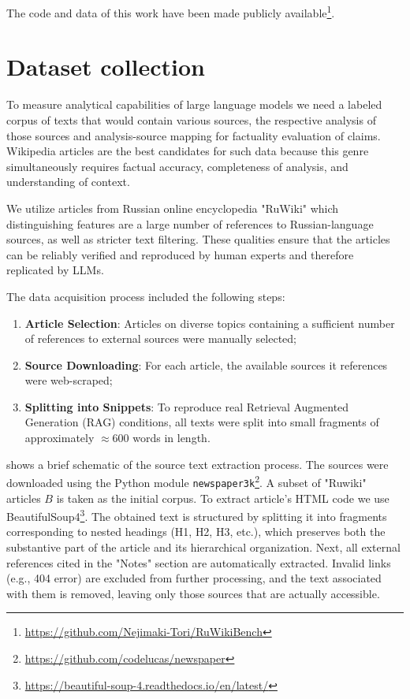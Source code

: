 \documentclass{superfri}
\begin{document}
The code and data of this work have been made publicly available\footnote{\url{https://github.com/Nejimaki-Tori/RuWikiBench}}.

\section{Dataset collection}
To measure analytical capabilities of large language models we need a labeled corpus of texts that would contain various sources, 
the respective analysis of those sources and analysis-source mapping for factuality evaluation of claims. 
Wikipedia articles are the best candidates for such data because this genre simultaneously requires factual accuracy, completeness of analysis, 
and understanding of context.

We utilize articles from Russian online encyclopedia "RuWiki" which distinguishing features are a large number of references to Russian-language sources, 
as well as stricter text filtering. These qualities ensure that the articles can be reliably verified and reproduced by human experts and therefore replicated by LLMs.

The data acquisition process included the following steps:
\begin{enumerate}
\item \textbf{Article Selection}: Articles on diverse topics containing a sufficient number of references to external sources were manually selected;
\item \textbf{Source Downloading}: For each article, the available sources it references were web-scraped;
\item \parbox[t]{0.9\textwidth}{\textbf{Splitting into Snippets}: To reproduce real Retrieval Augmented Generation (RAG) conditions, all texts were split into small fragments of approximately $\approx 600$ words in length.}
\end{enumerate}



 shows a brief schematic of the source text extraction process. The sources were downloaded using the Python module \texttt{newspaper3k}\footnote{\url{https://github.com/codelucas/newspaper}}.
A subset of "Ruwiki" articles \(B\) is taken as the initial corpus.
To extract article's HTML code we use BeautifulSoup4\footnote{\url{https://beautiful-soup-4.readthedocs.io/en/latest/}}.
The obtained text is structured by splitting it into fragments corresponding to nested headings (H1, H2, H3, etc.), which preserves both the substantive part of the article and its hierarchical organization.
Next, all external references cited in the "Notes" section are automatically extracted. Invalid links (e.g., 404 error) are excluded from further processing,
and the text associated with them is removed, leaving only those sources that are actually accessible.
\end{document}
